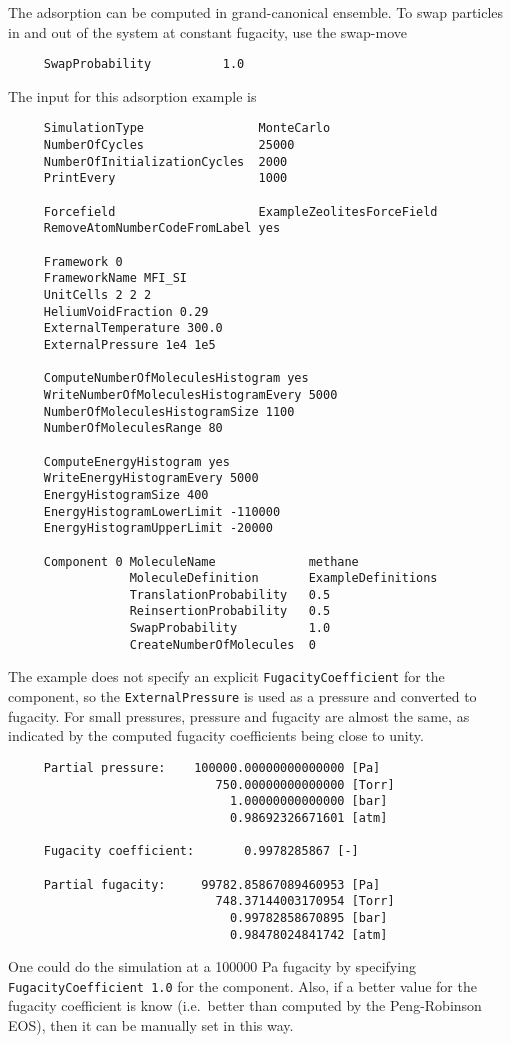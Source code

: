 The adsorption can be computed in grand-canonical ensemble. To swap particles in and out of the system
at constant fugacity, use the swap-move
\begin{verbatim}
     SwapProbability          1.0
\end{verbatim}
The input for this adsorption example is
\begin{tiny}
\begin{verbatim}
     SimulationType                MonteCarlo
     NumberOfCycles                25000
     NumberOfInitializationCycles  2000
     PrintEvery                    1000

     Forcefield                    ExampleZeolitesForceField
     RemoveAtomNumberCodeFromLabel yes

     Framework 0
     FrameworkName MFI_SI
     UnitCells 2 2 2
     HeliumVoidFraction 0.29
     ExternalTemperature 300.0
     ExternalPressure 1e4 1e5

     ComputeNumberOfMoleculesHistogram yes
     WriteNumberOfMoleculesHistogramEvery 5000
     NumberOfMoleculesHistogramSize 1100
     NumberOfMoleculesRange 80

     ComputeEnergyHistogram yes
     WriteEnergyHistogramEvery 5000
     EnergyHistogramSize 400
     EnergyHistogramLowerLimit -110000
     EnergyHistogramUpperLimit -20000

     Component 0 MoleculeName             methane
                 MoleculeDefinition       ExampleDefinitions
                 TranslationProbability   0.5
                 ReinsertionProbability   0.5
                 SwapProbability          1.0
                 CreateNumberOfMolecules  0
\end{verbatim}
\end{tiny}

The example does not specify an explicit \verb+FugacityCoefficient+ for the component, so the \verb+ExternalPressure+
is used as a pressure and converted to fugacity. For small pressures, pressure and fugacity are almost the same, as
indicated by the computed fugacity coefficients being close to unity.
\begin{tiny}
\begin{verbatim}
     Partial pressure:    100000.00000000000000 [Pa]
                             750.00000000000000 [Torr]
                               1.00000000000000 [bar]
                               0.98692326671601 [atm]

     Fugacity coefficient:       0.9978285867 [-]

     Partial fugacity:     99782.85867089460953 [Pa]
                             748.37144003170954 [Torr]
                               0.99782858670895 [bar]
                               0.98478024841742 [atm]
\end{verbatim}
\end{tiny}
One could do the simulation at a 100000 Pa fugacity by specifying \verb+FugacityCoefficient 1.0+ for the component.
Also, if a better value for the fugacity coefficient is know (i.e.\ better than computed by the Peng-Robinson EOS),
then it can be manually set in this way.

